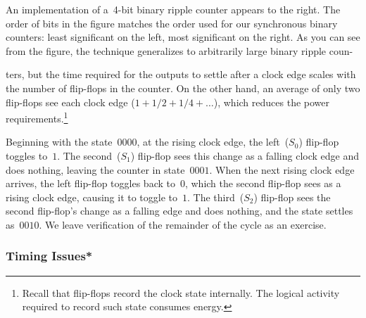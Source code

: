 \begin{minipage}{2.8in}
An implementation of a~\mbox{4-bit} binary ripple counter appears to the
right.
The order of bits in the figure matches the order used for our synchronous
binary counters: least significant on the left, most significant on the
right.
As you can see from the figure, the technique generalizes to arbitrarily 
large binary ripple coun-\linebreak
\end{minipage}\hspace{0.25in}%
\begin{minipage}{3.45in}
\vspace{12pt}
\end{minipage}\mpdone

ters, but the
time required for the outputs to settle after a clock edge scales with
the number of flip-flops in the counter.  On the other hand, an
average of only two flip-flops see each clock edge ($1 + 1/2 + 1/4 +
\ldots$), which reduces the power requirements.\footnote{Recall that
flip-flops record the clock state internally.  The logical activity
required to record such state consumes energy.}

\pagebreak

Beginning with the state~$0000$, at the rising clock edge, the left~($S_0$)
flip-flop toggles to~$1$.  The second~($S_1$) flip-flop sees this change as a
falling clock edge and does nothing, leaving the counter in
state~$0001$.  When the next rising clock edge arrives, the left
flip-flop toggles back to~$0$, which the second flip-flop sees as a
rising clock edge, causing it to toggle to~$1$.  The third~($S_2$) flip-flop
sees the second flip-flop's change as a falling edge and does nothing,
and the state settles as~$0010$.  We leave verification of the remainder 
of the cycle as an exercise.\\

\subsubsection{Timing Issues*}

